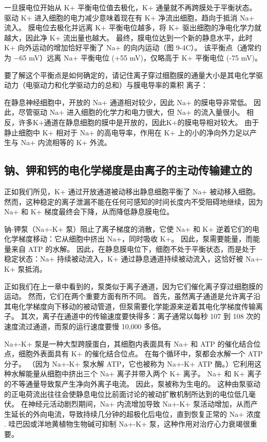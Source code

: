 一旦膜电位开始从 K+ 平衡电位值去极化，K+ 通量就不再跨膜处于平衡状态。 驱动 K+ 进入细胞的电力减少意味着现在有 K+ 净流出细胞，趋向于抵消 Na+ 流入。 膜电位去极化并远离 K+ 平衡电位越多，将 K+ 驱出细胞的净电化学力就越大，因此净 K+ 流出量也越大。 最终，膜电位达到一个新的静息水平，此时 K+ 向外运动的增加恰好平衡了 Na+ 的向内运动（图 9-4C）。 该平衡点（通常约为 −65 mV）远离 Na+ 平衡电位 (+55 mV)，仅略高于 K+ 平衡电位 (-75 mV)。

要了解这个平衡点是如何确定的，请记住离子穿过细胞膜的通量大小是其电化学驱动力（电驱动力和化学驱动力的总和）与膜电导率的乘积 离子：

在静息神经细胞中，开放的 Na+ 通道相对较少，因此 Na+ 的膜电导非常低。 因此，尽管驱动 Na+ 进入细胞的化学力和电力很大，但 Na+ 的流入量很小。 相反，许多K+通道在静息细胞的膜中是开放的，因此K+的膜电导相对较大。 由于静止细胞中 K+ 相对于 Na+ 的高电导率，作用在 K+ 上的小的净向外力足以产生与 Na+ 内流相等的 K+ 外流。


\subsection{钠、钾和钙的电化学梯度是由离子的主动传输建立的}
正如我们所见，K+ 通过开放通道被动移出静息细胞平衡了 Na+ 被动移入细胞。 然而，这种稳定的离子泄漏不能在任何可感知的时间长度内不受阻碍地继续，因为 Na+ 和 K+ 梯度最终会下降，从而降低静息膜电位。

钠-钾泵（Na+-K+ 泵）阻止了离子梯度的消散，它使 Na+ 和 K+ 逆着它们的电化学梯度移动：它从细胞中挤出 Na+，同时吸收 K+。 因此，泵需要能量，而能量来自 ATP 的水解。 因此，在静息膜电位下，细胞不处于平衡状态，而是处于稳定状态：Na+ 持续被动流入，K+ 通过静息通道持续被动流入，这恰好被 Na+-K+ 泵抵消。

正如我们在上一章中看到的，泵类似于离子通道，因为它们催化离子穿过细胞膜的运动。 然而，它们在两个重要方面有所不同。 首先，虽然离子通道是允许离子沿其电化学梯度向下移动的被动管道，但泵需要化学能源来逆着其电化学梯度传输离子。 其次，离子在通道中的传输速度要快得多：离子通常以每秒 107 到 108 次的速度流过通道，而泵的运行速度要慢 10,000 多倍。

Na+-K+ 泵是一种大型跨膜蛋白，其细胞内表面具有 Na+ 和 ATP 的催化结合位点，细胞外表面具有 K+ 的催化结合位点。 在每个循环中，泵都会水解一个 ATP 分子。 （因为 Na+-K+ 泵水解 ATP，它也被称为 Na+-K+ ATP 酶。）它利用这种水解能量从细胞中挤出三个 Na+ 离子并带入两个 K+ 离子。 Na+ 和 K+ 离子的不等通量导致泵产生净向外离子电流。 因此，泵被称为生电的。 这种由泵驱动的正电荷流出往往会使静息电位比前面讨论的被动扩散机制所达到的电位低几毫伏。 在神经元活动剧烈期间，Na+ 内流增加导致 Na+-K+ 泵活动增加，从而产生延长的外向电流，导致持续几分钟的超极化后电位，直到恢复正常的 Na+ 浓度 . 哇巴因或洋地黄植物生物碱可抑制 Na+-K+ 泵，这种作用对治疗心力衰竭很重要。

